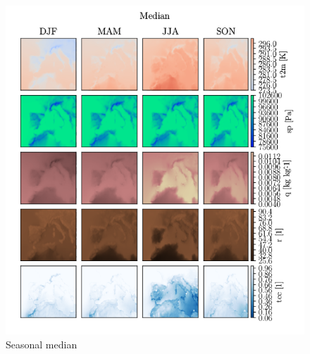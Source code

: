 \begin{figure}[ht]
    \centering
    \includegraphics{python_figs/seasonal_median_all_variables.png}
    \caption{Seasonal median}
    \label{fig:seasonal_median}
\end{figure}

\cleardoublepage
